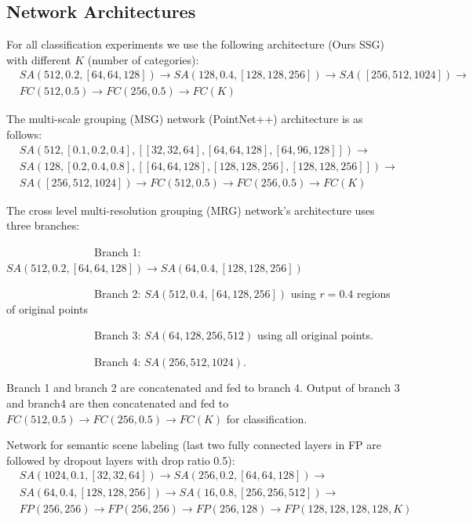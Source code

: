 \subsection{Network Architectures}
For all classification experiments we use the following architecture (Ours SSG) with different $K$ (number of categories):
\begin{equation*}
\begin{split}
    & SA(512,0.2,[64,64,128]) \rightarrow SA(128,0.4,[128,128,256]) \rightarrow SA([256,512,1024]) \rightarrow  \\
    & FC(512,0.5) \rightarrow FC(256,0.5) \rightarrow FC(K)
    \end{split}
\end{equation*}

The multi-scale grouping (MSG) network (PointNet++) architecture is as follows:
\begin{equation*}
\begin{split}
    & SA(512,[0.1,0.2,0.4],[[32,32,64],[64,64,128],[64,96,128]]) \rightarrow \\
    & SA(128,[0.2,0.4,0.8],[[64,64,128],[128,128,256],[128,128,256]]) \rightarrow \\
    & SA([256,512,1024]) \rightarrow  FC(512,0.5) \rightarrow FC(256,0.5) \rightarrow FC(K)
    \end{split}
\end{equation*}

The cross level multi-resolution grouping (MRG) network's architecture uses three branches:

~~~~~~~~~~~~~~~~Branch 1: $SA(512,0.2,[64,64,128]) \rightarrow SA(64,0.4,[128,128,256])$

~~~~~~~~~~~~~~~~Branch 2: $SA(512,0.4,[64,128,256])$ using $r=0.4$ regions of original points

~~~~~~~~~~~~~~~~Branch 3: $SA(64,128,256,512)$ using all original points.

~~~~~~~~~~~~~~~~Branch 4: $SA(256,512,1024)$. 

Branch 1 and branch 2 are concatenated and fed to branch 4. Output of branch 3 and branch4 are then concatenated and fed to $ FC(512,0.5) \rightarrow FC(256,0.5) \rightarrow FC(K)$ for classification. 


Network for semantic scene labeling (last two fully connected layers in FP are followed by dropout layers with drop ratio 0.5):
\begin{equation*}
\begin{split}
    & SA(1024,0.1,[32,32,64]) \rightarrow SA(256,0.2,[64,64,128]) \rightarrow \\
    & SA(64,0.4,[128,128,256]) \rightarrow  SA(16,0.8,[256,256,512]) \rightarrow\\
    & FP(256,256) \rightarrow FP(256,256) \rightarrow FP(256,128) \rightarrow FP(128,128,128,128,K)
    \end{split}
\end{equation*}


